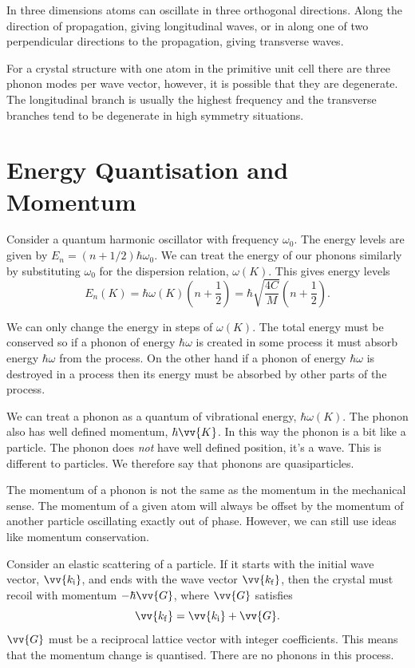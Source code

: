 \documentclass[fleqn]{NotesClass}
\begin{document}
    In three dimensions atoms can oscillate in three orthogonal directions.
    Along the direction of propagation, giving longitudinal waves, or in along one of two perpendicular directions to the propagation, giving transverse waves.
    
    For a crystal structure with one atom in the primitive unit cell there are three phonon modes per wave vector, however, it is possible that they are degenerate.
    The longitudinal branch is usually the highest frequency and the transverse branches tend to be degenerate in high symmetry situations.
    
    \section{Energy Quantisation and Momentum}
    Consider a quantum harmonic oscillator with frequency \(\omega_{0}\).
    The energy levels are given by \(E_n = (n + 1/2)\hbar\omega_0\).
    We can treat the energy of our phonons similarly by substituting \(\omega_0\) for the dispersion relation, \(\omega(K)\).
    This gives energy levels
    \begin{equation}
        E_n(K) = \hbar\omega(K)\left( n + \frac{1}{2} \right) = \hbar\sqrt{\frac{4C}{M}}\left( n + \frac{1}{2} \right).
    \end{equation}
    
    We can only change the energy in steps of \(\omega(K)\).
    The total energy must be conserved so if a phonon of energy \(\hbar\omega\) is created in some process it must absorb energy \(\hbar\omega\) from the process.
    On the other hand if a phonon of energy \(\hbar\omega\) is destroyed in a process then its energy must be absorbed by other parts of the process.
    
    We can treat a phonon as a quantum of vibrational energy, \(\hbar\omega(K)\).
    The phonon also has well defined momentum, \(\hbar\vv{K}\).
    In this way the phonon is a bit like a particle.
    The phonon does \emph{not} have well defined position, it's a wave.
    This is different to particles.
    We therefore say that phonons are quasiparticles.
    
    The momentum of a phonon is not the same as the momentum in the mechanical sense.
    The momentum of a given atom will always be offset by the momentum of another particle oscillating exactly out of phase.
    However, we can still use ideas like momentum conservation.
    
    Consider an elastic scattering of a particle.
    If it starts with the initial wave vector, \(\vv{k_{\mathrm{i}}}\), and ends with the wave vector \(\vv{k_{\mathrm{f}}}\), then the crystal must recoil with momentum \(-\hbar\vv{G}\), where \(\vv{G}\) satisfies
    \begin{equation}
        \vv{k_{\mathrm{f}}} = \vv{k_{\mathrm{i}}} + \vv{G}.
    \end{equation}
    \(\vv{G}\) must be a reciprocal lattice vector with integer coefficients.
    This means that the momentum change is quantised.
    There are no phonons in this process.
    
\end{document}
